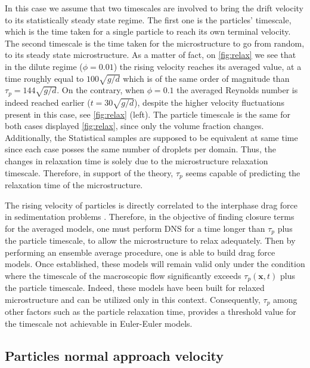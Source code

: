 In this case we assume that two timescales are involved to bring the drift velocity to its statistically steady state regime. 
The first one is the particles' timescale, which is the time taken for a single particle to reach its own terminal velocity. 
The second timescale is the time taken for the microstructure to go from random, to its steady state microstructure. 
As a matter of fact, on \ref{fig:relax} we see that in the dilute regime ($\phi=0.01$) the rising velocity reaches its averaged value, at a time roughly equal to $100\sqrt{g/d}$ which is of the same order of magnitude than $\tau_p = 144\sqrt{g/d}$. 
On the contrary, when $\phi =0.1$ the averaged Reynolds number is indeed reached earlier ($t = 30\sqrt{g/d}$), despite the higher velocity fluctuations present in this case, see \ref{fig:relax} (left). 
The particle timescale is the same for both cases displayed \ref{fig:relax}, since only the volume fraction changes.
Additionally, the Statistical samples are supposed to be equivalent at same time since each  case posses the same number of droplets per domain. 
Thus, the changes in relaxation time is solely due to the microstructure relaxation timescale. 
Therefore, in support of the theory, $\tau_p$ seems capable of predicting the relaxation time of the microstructure.


The rising velocity of particles is directly correlated to the interphase drag force in sedimentation problems \citep{jackson1997locally}. 
Therefore, in the objective of finding closure terms for the averaged models, one must perform DNS for a time longer than $\tau_p$ plus the particle timescale, to allow the microstructure to relax adequately.
Then by performing an ensemble average procedure, one is able to build drag force models. 
Once established, these models will remain valid only under the condition where the timescale of the macroscopic flow significantly exceeds $\tau_p(\textbf{x},t)$ plus the particle timescale.
Indeed, these models have been built for relaxed microstructure and can be utilized only in this context.
Consequently, $\tau_p$ among other factors such as the particle relaxation time, provides a threshold value for the timescale not achievable in Euler-Euler models. 

\subsection{Particles normal approach velocity}

